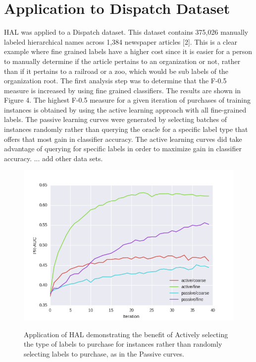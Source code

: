 \documentclass[ms]{nuthesis}
\begin{document}
\section{Application to Dispatch Dataset}
\par HAL was applied to a Dispatch dataset. This dataset contains 375,026 manually labeled
hierarchical names across 1,384 newspaper articles [2]. This is a clear example where
fine grained labels have a higher cost since it is easier for a person to manually
determine if the article pertains to an organization or not, rather than if it pertains
to a railroad or a zoo, which would be sub labels of the organization root. The first
analysis step was to determine that the F-0.5 measure is increased by using fine
grained classifiers. The results are shown in Figure 4. The highest F-0.5 measure for
a given iteration of purchases of training instances is obtained by using the active
learning approach with all fine-grained labels. The passive learning curves were
 generated by selecting batches of instances randomly rather than querying the
 oracle for a specific label type that offers that most gain in classifier accuracy.
 The active learning curves did take advantage of querying for specific labels in
 order to maximize gain in classifier accuracy. ... add other data sets.

\FloatBarrier
\begin{figure}[!htb]
	\centering
    \includegraphics[width=1.0\columnwidth]{fig/draft-richmond}
    \label{fig:draft-richmond}
    \caption{Application of HAL demonstrating the benefit of Actively selecting the type
    of labels to purchase for instances rather than randomly selecting labels to purchase,
    as in the Passive curves.}
\end{figure}
\FloatBarrier
\end{document}
